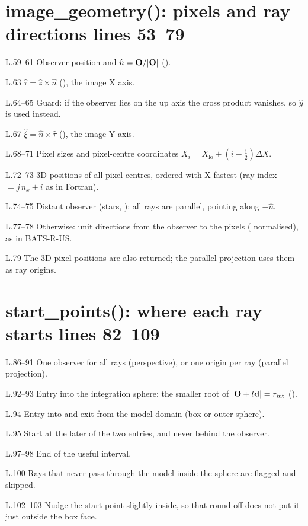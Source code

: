 \section*{\normalsize image\_geometry(): pixels and ray directions \hfill{\small\mdseries\color{gray}lines 53--79}}

\begin{lines}
\item[L.59–61] Observer position and $\hat n=\mathbf{O}/|\mathbf{O}|$ ().
\item[L.63] $\hat\tau=\hat z\times\hat n$ (), the image X axis.
\item[L.64–65] Guard: if the observer lies on the up axis the cross product vanishes, so $\hat y$ is used instead.
\item[L.67] $\hat\xi=\hat n\times\hat\tau$ (), the image Y axis.
\item[L.68–71] Pixel sizes and pixel-centre coordinates $X_i=X_\text{lo}+(i-\tfrac12)\Delta X$.
\item[L.72–73] 3D positions of all pixel centres, ordered with X fastest (ray index $= j\,n_x+i$ as in Fortran).
\item[L.74–75] Distant observer (stars, ): all rays are parallel, pointing along $-\hat n$.
\item[L.77–78] Otherwise: unit directions from the observer to the pixels ( normalised), as in BATS-R-US.
\item[L.79] The 3D pixel positions are also returned; the parallel projection uses them as ray origins.
\end{lines}
\section*{\normalsize start\_points(): where each ray starts \hfill{\small\mdseries\color{gray}lines 82--109}}

\begin{lines}
\item[L.86–91] One observer for all rays (perspective), or one origin per ray (parallel projection).
\item[L.92–93] Entry into the integration sphere: the smaller root of $|\mathbf{O}+t\mathbf{d}|=r_\text{int}$ ().
\item[L.94] Entry into and exit from the model domain (box or outer sphere).
\item[L.95] Start at the later of the two entries, and never behind the observer.
\item[L.97–98] End of the useful interval.
\item[L.100] Rays that never pass through the model inside the sphere are flagged and skipped.
\item[L.102–103] Nudge the start point slightly inside, so that round-off does not put it just outside the box face.
\end{lines}
